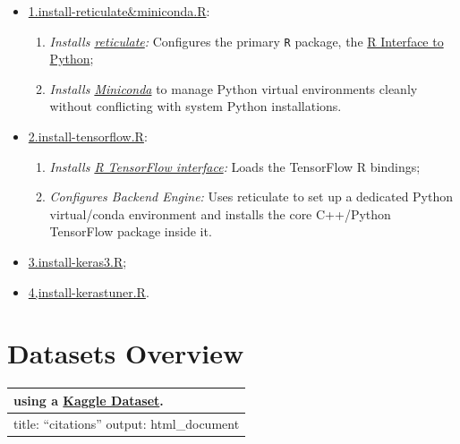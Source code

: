 \documentclass[
]{report}
\newcounter{none} %
\providecommand{\tightlist}{%
  \setlength{\itemsep}{0pt}\setlength{\parskip}{0pt}}
\begin{document}
\begin{itemize}
\tightlist
\item
  \href{https://github.com/AzKurban-edX-DS/edx.capstone.choose-your-own/tree/main/r/support-scripts/setup-env/1.install-reticulate&miniconda.R}{1.install-reticulate\&miniconda.R}:

  \begin{enumerate}
  \def\labelenumi{\arabic{enumi}.}
  \tightlist
  \item
    \emph{Installs \href{https://rstudio.github.io/reticulate/articles/package.html}{reticulate}:} Configures the primary \texttt{R} package, the \href{https://rstudio.github.io/reticulate/}{R Interface to Python};
  \item
    \emph{Installs \href{https://continuumio-docs.readthedocs-hosted.com/miniconda/}{Miniconda}} to manage Python virtual environments cleanly without conflicting with system Python installations.
  \end{enumerate}
\item
  \href{https://github.com/AzKurban-edX-DS/edx.capstone.choose-your-own/tree/main/r/support-scripts/setup-env/2.install-tensorflow.R}{2.install-tensorflow.R}:

  \begin{enumerate}
  \def\labelenumi{\arabic{enumi}.}
  \tightlist
  \item
    \emph{Installs \href{https://github.com/rstudio/tensorflow}{R TensorFlow interface}:} Loads the TensorFlow R bindings;
  \item
    \emph{Configures Backend Engine:} Uses reticulate to set up a dedicated Python virtual/conda environment and installs the core C++/Python TensorFlow package inside it.
  \end{enumerate}
\item
  \href{https://github.com/AzKurban-edX-DS/edx.capstone.choose-your-own/tree/main/r/support-scripts/setup-env/3.install-keras3.R}{3.install-keras3.R};
\item
  \href{https://github.com/AzKurban-edX-DS/edx.capstone.choose-your-own/tree/main/r/support-scripts/setup-env/4.install-kerastuner.R}{4,install-kerastuner.R}.
\end{itemize}

\section{Datasets Overview}\label{datasets-overview}

{\def\LTcaptype{none} %
\begin{longtable}[]{@{}
  >{\raggedright\arraybackslash}p{}@{}}
\toprule\noalign{}
\begin{minipage}[b]{\linewidth}\raggedright
using a \href{https://www.kaggle.com/datasets/vaibhao/handwritten-characters}{Kaggle Dataset}.
\end{minipage} \\
\midrule\noalign{}
\endhead
\bottomrule\noalign{}
\endlastfoot
title: ``citations''
output: html\_document \\
\end{longtable}
}
\end{document}
